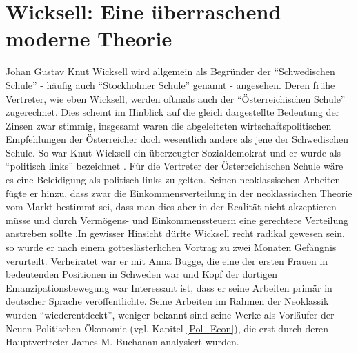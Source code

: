 \section{Wicksell: Eine überraschend moderne Theorie}
\label{Wicksell}

Johan Gustav Knut Wicksell wird allgemein als Begründer der "`Schwedischen Schule"' - häufig auch "`Stockholmer Schule"' genannt - angesehen. Deren frühe Vertreter, wie eben Wicksell, werden oftmals auch der "`Österreichischen Schule"' zugerechnet. Dies scheint im Hinblick auf die gleich dargestellte Bedeutung der Zinsen zwar stimmig, insgesamt waren die abgeleiteten wirtschaftspolitischen Empfehlungen der Österreicher doch wesentlich andere als jene der Schwedischen Schule. So war Knut Wicksell ein überzeugter Sozialdemokrat und er wurde als "`politisch links"' bezeichnet \parencite[S. 210, S. 192]{Grossekettler1989}. Für die Vertreter der Österreichischen Schule wäre es eine Beleidigung als politisch links zu gelten. Seinen neoklassischen Arbeiten fügte er hinzu, dass zwar die Einkommensverteilung in der neoklassischen Theorie vom Markt bestimmt sei, dass man dies aber in der Realität nicht akzeptieren müsse und durch Vermögens- und Einkommenssteuern eine gerechtere Verteilung anstreben sollte \parencite[S. 196]{Grossekettler1989}.In gewisser Hinsicht dürfte Wicksell recht radikal gewesen sein, so wurde er nach einem gotteslästerlichen Vortrag zu zwei Monaten Gefängnis verurteilt. Verheiratet war er mit Anna Bugge, die eine der ersten Frauen in bedeutenden Positionen in Schweden war und Kopf der dortigen Emanzipationsbewegung war \parencite[S. 191]{Grossekettler1989} Interessant ist, dass er seine Arbeiten primär in deutscher Sprache veröffentlichte. Seine Arbeiten im Rahmen der Neoklassik wurden "`wiederentdeckt"', weniger bekannt sind seine Werke als Vorläufer der Neuen Politischen Ökonomie (vgl. Kapitel \ref{Pol_Econ}), die erst durch deren Hauptvertreter James M. Buchanan analysiert wurden. 

